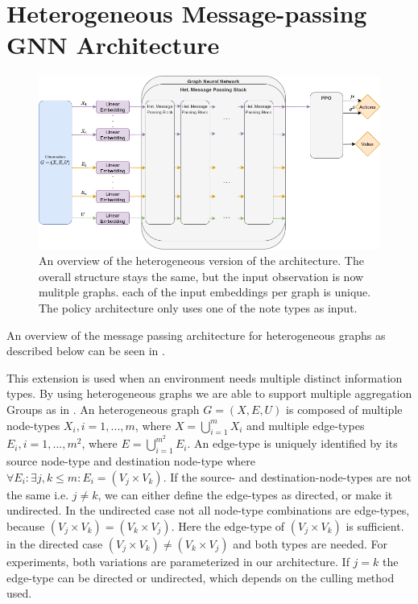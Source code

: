 \section{Heterogeneous Message-passing GNN Architecture}
\begin{figure}[htp]
    \centering
    \includegraphics[width=1.0\textwidth]{figures/heterogeneous_gnn.png}
    \hspace{1cm}   
    \caption{An overview of the heterogeneous version of the architecture. The overall structure stays the same, but the input observation is now mulitple graphs. each of the input embeddings per graph is unique. The policy architecture only uses one of the note types as input.}
    \label{fig:heterogeneous_gnn}
\end{figure}

An overview of the message passing architecture for heterogeneous graphs as described below can be seen in .

This extension is used when an environment needs multiple distinct information types. By using heterogeneous graphs we are able to support multiple aggregation Groups as in . An heterogeneous graph $G = (X, E, U)$ is composed of multiple node-types $X_i, i = 1,...,m$, where $X = \bigcup_{i=1}^m X_i$ and multiple edge-types $E_i, i = 1,...,m^2$, where $E = \bigcup_{i=1}^{m^2} E_i$. An edge-type is uniquely identified by its source node-type and destination node-type where $\forall E_i: \exists j,k \leq m: E_i = (V_j \times V_k)$. If the source- and destination-node-types are not the same i.e. $j \neq k$, we can either define the edge-types as directed, or make it undirected. In the undirected case not all node-type combinations are edge-types, because $(V_j \times V_k) = (V_k \times V_j)$. Here the edge-type of $(V_j \times V_k)$ is sufficient. in the directed case $(V_j \times V_k) \neq (V_k \times V_j)$ and both types are needed. For experiments, both variations are parameterized in our architecture. If $j = k$ the edge-type can be directed or undirected, which depends on the culling method used. \par

